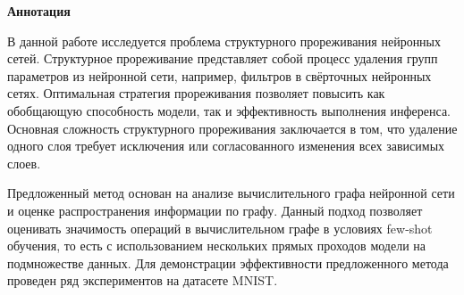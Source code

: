 \begin{center}
    \Large{\textbf{Аннотация}}
\end{center}

\begin{singlespace}
В данной работе исследуется проблема структурного прореживания нейронных сетей. Структурное прореживание представляет собой процесс удаления групп параметров из нейронной сети, например, фильтров в свёрточных нейронных сетях. Оптимальная стратегия прореживания позволяет повысить как обобщающую способность модели, так и эффективность выполнения инференса. Основная сложность структурного прореживания заключается в том, что удаление одного слоя требует исключения или согласованного изменения всех зависимых слоев.

Предложенный метод основан на анализе вычислительного графа нейронной сети и оценке распространения информации по графу. Данный подход позволяет оценивать значимость операций в вычислительном графе в условиях few-shot обучения, то есть с использованием нескольких прямых проходов модели на подмножестве данных. Для демонстрации эффективности предложенного метода проведен ряд экспериментов на датасете MNIST.
\end{singlespace}
